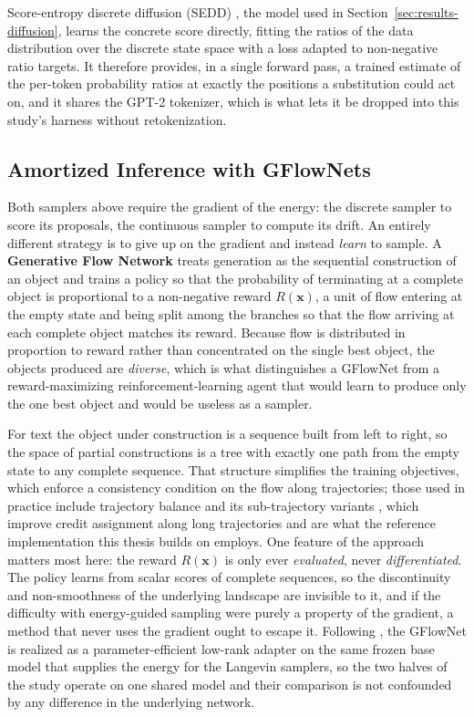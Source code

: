 Score-entropy discrete diffusion (SEDD) \citep{lou2024discrete}, the model used in Section~\ref{sec:results-diffusion}, learns the concrete score directly, fitting the ratios of the data distribution over the discrete state space with a loss adapted to non-negative ratio targets. It therefore provides, in a single forward pass, a trained estimate of the per-token probability ratios at exactly the positions a substitution could act on, and it shares the GPT-2 tokenizer, which is what lets it be dropped into this study's harness without retokenization.

\subsection{Amortized Inference with GFlowNets}
\label{sec:bg-gflownet}

Both samplers above require the gradient of the energy: the discrete sampler to score its proposals, the continuous sampler to compute its drift. An entirely different strategy is to give up on the gradient and instead \emph{learn} to sample. A \textbf{Generative Flow Network} \citep{bengio2021flow, bengio2023gflownet} treats generation as the sequential construction of an object and trains a policy so that the probability of terminating at a complete object is proportional to a non-negative reward $R(\bm{x})$, a unit of flow entering at the empty state and being split among the branches so that the flow arriving at each complete object matches its reward. Because flow is distributed in proportion to reward rather than concentrated on the single best object, the objects produced are \emph{diverse}, which is what distinguishes a GFlowNet from a reward-maximizing reinforcement-learning agent that would learn to produce only the one best object and would be useless as a sampler.

For text the object under construction is a sequence built from left to right, so the space of partial constructions is a tree with exactly one path from the empty state to any complete sequence. That structure simplifies the training objectives, which enforce a consistency condition on the flow along trajectories; those used in practice include trajectory balance \citep{malkin2022trajectory} and its sub-trajectory variants \citep{madan2023learning}, which improve credit assignment along long trajectories and are what the reference implementation this thesis builds on employs. One feature of the approach matters most here: the reward $R(\bm{x})$ is only ever \emph{evaluated}, never \emph{differentiated}. The policy learns from scalar scores of complete sequences, so the discontinuity and non-smoothness of the underlying landscape are invisible to it, and if the difficulty with energy-guided sampling were purely a property of the gradient, a method that never uses the gradient ought to escape it. Following \citet{hu2024amortizing}, the GFlowNet is realized as a parameter-efficient low-rank adapter \citep{hu2022lora} on the same frozen base model that supplies the energy for the Langevin samplers, so the two halves of the study operate on one shared model and their comparison is not confounded by any difference in the underlying network.

